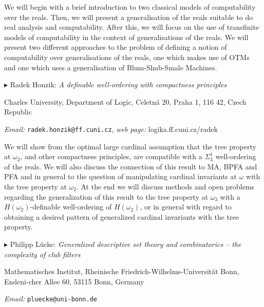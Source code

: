 \documentclass[a4paper]{amsart}
\theoremstyle{remark}
\newcommand{\vsp}{\vspace{20pt}}
\begin{document}
We will begin with a brief introduction to two classical models of computability over the reals. Then, we will present a generalisation of the reals suitable to do real analysis and computability. After this, we will focus on the use of transfinite models of computability in the context of generalisations of the reals. We will present two different approaches to the problem of defining a notion of computability over generalisations of the reals, one which makes use of OTMs and one which uses a generalisation of Blum-Shub-Smale Machines. 








\vsp 

\noindent 
$\blacktriangleright$ Radek Honzik: \emph{A definable well-ordering with compactness principles} 

\noindent 
Charles University, Department of Logic,
Celetn{\' a} 20, Praha 1, 
116 42, Czech Republic 

\noindent 
\emph{Email:} \texttt{radek.honzik@ff.cuni.cz}, \emph{web page:} logika.ff.cuni.cz/radek  

We will show from the optimal large cardinal assumption that the tree property at $\omega_2$, and other compactness principles, are compatible with a $\Sigma^1_3$ well-ordering of the reals. We will also discuss the connection of this result to MA, BPFA and PFA and in general to the question of manipulating cardinal invariants at $\omega$ with the tree property at $\omega_2$. At the end we will discuss methods and open problems regarding the generalization of this result to the tree property at $\omega_3$ with a $H(\omega_2)$-definable well-ordering of $H(\omega_2)$, or in general with regard to obtaining a desired pattern of generalized cardinal invariants with the tree property.







\vsp 

\newpage 

\noindent 
$\blacktriangleright$ Philipp L\"ucke: \emph{Generalized descriptive set theory and combinatorics -- the complexity of club filters} 

\noindent 
Mathematisches Institut, Rheinische Friedrich-Wilhelms-Universit\"at Bonn, Endeni-cher Allee 60, 53115 Bonn, Germany 

\noindent 
\emph{Email:} \texttt{pluecke@uni-bonn.de}
\end{document}
